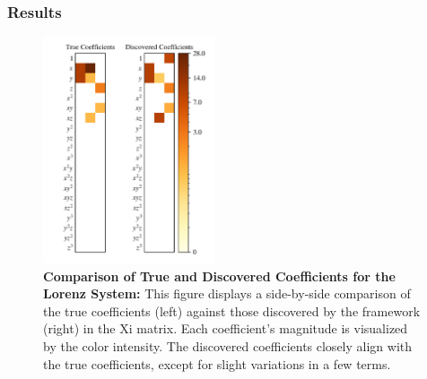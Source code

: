 \subsubsection{Results}



\begin{figure}[htbp]
    \centering
    \includegraphics[width=0.45\textwidth]{project_2/images/xi_plot_lorenz.png}
    \vspace{-4mm}
    \caption{\textbf{Comparison of True and Discovered Coefficients for the Lorenz System:} This figure displays a side-by-side comparison of the true coefficients (left) against those discovered by the framework (right) in the Xi matrix. Each coefficient's magnitude is visualized by the color intensity. The discovered coefficients closely align with the true coefficients, except for slight variations in a few terms.}
    \label{fig:xi_plot_lorenz}
\end{figure}
